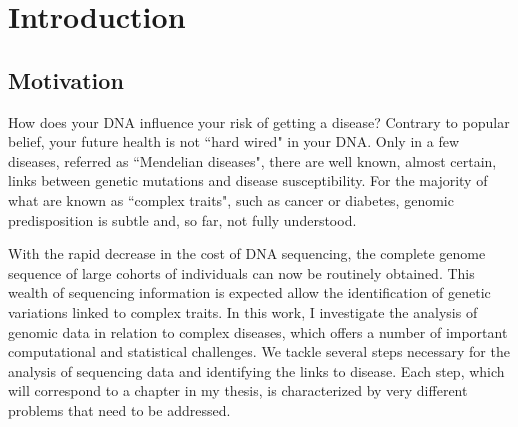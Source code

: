 \chapter{Introduction \label{ch:intro}}

\section{Motivation}

How does your DNA influence your risk of getting a disease? Contrary to popular belief, your future health is not ``hard wired" in your DNA. Only in a few diseases, referred as ``Mendelian diseases", there are well known, almost certain, links between genetic mutations and disease susceptibility. For the majority of what are known as ``complex traits", such as cancer or diabetes, genomic predisposition is subtle and, so far, not fully understood.

With the rapid decrease in the cost of DNA sequencing, the complete genome sequence of large cohorts of individuals can now be routinely obtained. This wealth of sequencing information is expected allow the identification of genetic variations linked to complex traits. In this work, I investigate the analysis of genomic data in relation to complex diseases, which offers a number of important computational and statistical challenges. We tackle several steps necessary for the analysis of sequencing data and identifying the links to disease. Each step, which will correspond to a chapter in my thesis, is characterized by very different problems that need to be addressed.

